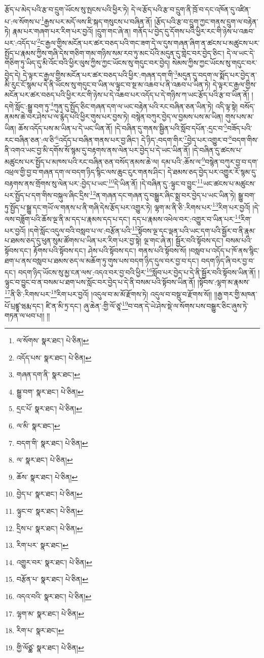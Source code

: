 རྩོད་པ་མེད་པའི་རྩ་བ་དྲུག་ཡོངས་སུ་སྤངས་པའི་ཕྱིར་ཏེ། དེ་ལ་རྩོད་པའི་རྩ་བ་དྲུག་ནི་ཁྲོ་བ་དང་འཁོན་དུ་འཛིན་པ་:ལ་སོགས་པ་\footnote{ལ་སོགས་  སྣར་ཐང་།  པེ་ཅིན། }རྒྱས་པར་མདོ་ལས་ཇི་སྐད་གསུངས་པ་བཞིན་ནོ། །རྩོད་པའི་རྩ་བ་དྲུག་ཀྱང་གནས་དྲུག་ལ་བརྟེན་ཏེ། རྣམ་པར་གཞག་པར་རིག་པར་བྱའོ། །དྲུག་གང་ཞེ་ན། གནོད་པ་བྱེད་དུ་དོགས་པའི་ཕྱིར་རང་གི་ཉེས་པ་འཆབ་པར་:འདོད་པ་\footnote{འདོད་པས་  སྣར་ཐང་།  པེ་ཅིན། }ང་རྒྱལ་གྱིས་མངོན་པར་ཚར་བཅད་པའི་གང་ཟག་དེ་ལ་དུས་གཞན་ཞིག་ན་ཚངས་པ་མཚུངས་པར་སྤྱོད་པ་རྣམས་ཀྱིས་གཞི་དེས་གཅིག་གམ་གཉིས་སམ་རབ་ཏུ་མང་པོའི་མདུན་དུ་གླེང་བར་བྱེད་ཅིང་། དེ་ལ་ཡང་དེ་གཅིག་ཏུ་ཡིད་དུ་མི་འོང་བའི་ཕྱིར་ལུས་ཀྱིས་ཀྱང་ཡོངས་སུ་གདུང་བར་བྱེད། སེམས་ཀྱིས་ཀྱང་ཡོངས་སུ་གདུང་བར་བྱེད་དེ། དེ་ལྟར་ང་རྒྱལ་གྱིས་མངོན་པར་ཚར་བཅད་པའི་ཕྱིར་:གཞན་དག་གི་\footnote{གཞན་དག་ནི་  སྣར་ཐང་། }མདུན་དུ་བདག་ལ་སྨོད་པར་བྱེད་ན་མི་རུང་ངོ་སྙམ་པ་དེ་ནི་ཡོངས་སུ་གདུང་བ་ཡིན་ལ་ལྟུང་བ་སྔ་མ་འཆབ་པ་ནི་འཆབ་པ་ཡིན་ཏེ། དེ་ལྟར་ང་རྒྱལ་གྱིས་མངོན་པར་ཚར་བཅད་པའི་ཕྱིར་རང་གི་ཉེས་པ་དེ་འཆབ་པར་འདོད་པ་དེ་གཉིས་ཀ་ཡང་རྩོད་པའི་རྩ་བ་ཡིན་ནོ། །དགེ་སློང་:སྒྱུ་བག་ཏུ་\footnote{སྒྱུ་བག་  སྣར་ཐང་།  པེ་ཅིན། }ཀུན་དུ་སྤྱོད་ཅིང་གཞན་དག་ལ་ཡང་བརྟེན་པའི་རང་བཞིན་ཅན་ཡིན་ཏེ། འདི་ལྟ་སྟེ། བསོད་ནམས་ཆེ་བར་ཤེས་པ་ལ་རྙེད་པའི་ཕྱིར་གུས་པར་བྱས་ཏེ། བསྙེན་བཀུར་བྱེད་ལ་བྱམས་པས་མ་ཡིན། གུས་པས་མ་ཡིན། ཆོས་འདོད་པས་མ་ཡིན་པ་དེ་ཡང་ཡིན་ནོ། །དེ་བཞིན་དུ་གནས་སྦྱིན་པའི་སློབ་དཔོན་:དྲང་བ་\footnote{དྲང་པོ་  སྣར་ཐང་།  པེ་ཅིན། }བཟོད་པའི་རང་བཞིན་ཅན་:ལ་ཅི་\footnote{ལ་མི་  སྣར་ཐང་། }འདོད་པ་བཞིན་གནས་པར་བྱ་ཞིང་། དེ་ཉིད་:བདག་གིར་\footnote{བདག་གི་  སྣར་ཐང་།  པེ་ཅིན། }བྱེད་པར་འགྱུར་བ་\footnote{ལ་  སྣར་ཐང་།  པེ་ཅིན། }བདག་གིས་ནི་འགའ་ཡང་བྱ་མི་དགོས་སོ་སྙམ་དུ་བརྟགས་ནས་ལེན་པར་བྱེད་པ་དེ་ཡང་ཡིན་ནོ། །དེ་བཞིན་དུ་ཚངས་པ་མཚུངས་པར་སྤྱོད་པ་མཁས་པའི་རང་བཞིན་ཅན་བསོད་ནམས་ཆེ་ལ། དམ་པའི་:ཆོས་ལ་\footnote{ཆོས་  སྣར་ཐང་།  པེ་ཅིན། }བསྙེན་བཀུར་བྱ་བ་དག་འཕྲལ་གྱི་བྱ་བ་གཞན་དག་ལ་བདག་ཉིད་སྙིང་ལས་ཆུང་ངུར་གནས་ཤིང་། དེ་ཐམས་ཅད་བྱེད་པར་འགྱུར་རོ་སྙམ་དུ་བརྟགས་ནས་གྲོགས་སུ་ལེན་པར་:བྱེད་པ་ཡང་\footnote{བྱེད་པ་  སྣར་ཐང་།  པེ་ཅིན། }དེ་ཡིན་ནོ། །དེ་བཞིན་དུ་:ལྟུང་བ་བྱུང་\footnote{ལྟུང་བ་  སྣར་ཐང་།  པེ་ཅིན། }ཡང་ཚངས་པ་མཚུངས་པར་སྤྱོད་པ་དག་གིས་བསྐུལ་ཞིང་དྲིས་\footnote{དྲིས་པ་  སྣར་ཐང་།  པེ་ཅིན། }ན་གཞན་དང་གཞན་དུ་བསྒྱུར་ཞིང་སྨྲ་བར་བྱེད་པ་ཡང་ཡིན་ཏེ། སྒྱུ་བག་ཏུ་སྤྱོད་པ་སྒྱུ་དང་གཡོ་ལ་གནས་པ་ནི་གཞི་དེས་རྩོད་པར་འགྱུར་ཏེ། ལྷག་མ་ནི་ཅི་:རིགས་པར་\footnote{རིག་པར་  སྣར་ཐང་། }རིག་པར་བྱའོ། །དེ་ལས་བཟློག་པའི་ཆོས་ལྔ་ནི་མ་དད་པ་རྣམས་དད་པ་དང་། དད་པ་རྣམས་འཕེལ་བར་:འགྱུར་བ་ཡིན་པར་\footnote{འགྱུར་བར་  སྣར་ཐང་།  པེ་ཅིན། }རིག་པར་བྱའོ། །དགེ་སློང་འདུལ་བའི་བསླབ་པ་ལ་:བརྩོན་པའི་\footnote{བརྩོན་པ་  སྣར་ཐང་།  པེ་ཅིན། }སྟོབས་ལྔ་དང་ལྡན་པའི་ཡང་དག་པའི་སྦྱོར་བ་ནི་རྣམ་པ་ཐམས་ཅད་དུ་ཕུན་སུམ་ཚོགས་པ་ཡིན་པར་རིག་པར་བྱ་སྟེ། ལྔ་གང་ཞེ་ན། སྦྱོར་བའི་སྟོབས་དང་། བསམ་པའི་སྟོབས་དང་། རྟོགས་པའི་སྟོབས་དང་། ཤེས་པའི་སྟོབས་དང་། གནས་པའི་སྟོབས་སོ། །བསླབ་པ་འདོད་པ་ཁོ་ནས་སྙིང་ཐག་པ་ནས་བསླབ་པ་ཐམས་ཅད་ལ་མཆོག་ཏུ་གུས་པས་བདག་ཉིད་དུལ་བར་བྱ་བ་དང་། བདག་ཉིད་ཞི་བར་བྱ་བ་དང་། བདག་ཉིད་ཡོངས་སུ་མྱ་ངན་ལས་:འདའ་བར་བྱ་བའི་ཕྱིར་\footnote{འདའ་བའི་  སྣར་ཐང་།  པེ་ཅིན། }སློབ་པར་བྱེད་པ་དེ་ནི་སྦྱོར་བའི་སྟོབས་ཡིན་ནོ། །ལྟུང་བ་བྱུང་བ་ན་བསམ་པ་ཐག་པས་སློང་བར་བྱེད་པ་དེ་ནི་བསམ་པའི་སྟོབས་ཡིན་ནོ། །སྟོབས་:ལྷག་མ་རྣམས་\footnote{ལྷག་མ་  སྣར་ཐང་།  པེ་ཅིན། }ནི་ཅི་:རིགས་པར་\footnote{རིག་པ་  སྣར་ཐང་། }རིག་པར་བྱའོ། །འདུལ་བ་མ་མོ་རྫོགས་ཏེ། འདུལ་བ་བསྡུ་བ་རྫོགས་སོ།། །།རྒྱ་གར་གྱི་མཁན་པོ་པྲཛྙཱ་ཝརྨ་དང་། ཛི་ན་མི་ཏྲ་དང་། ཞུ་ཆེན་:གྱི་ལོ་ཙཱ་\footnote{གྱི་ལོཙྪ་  སྣར་ཐང་།  པེ་ཅིན། }བ་བན་དེ་ཡེ་ཤེས་སྡེ་ལ་སོགས་པས་བསྒྱུར་ཅིང་ཞུས་ཏེ་གཏན་ལ་ཕབ་པ།། །།